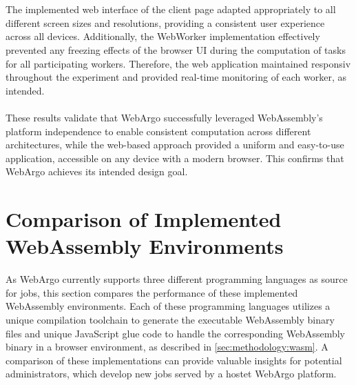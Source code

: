 \\~\\
The implemented web interface of the client page adapted appropriately to all different screen sizes and resolutions, providing a consistent user experience across all devices. Additionally, the WebWorker implementation effectively prevented any freezing effects of the browser \ac{UI} during the computation of tasks for all participating workers. Therefore, the web application maintained responsiv throughout the experiment and provided real-time monitoring of each worker, as intended.
\\~\\
These results validate that WebArgo successfully leveraged WebAssembly's platform independence to enable consistent computation across different architectures, while the web-based approach provided a uniform and easy-to-use application, accessible on any device with a modern browser. This confirms that WebArgo achieves its intended design goal.

\section{Comparison of Implemented WebAssembly Environments}
\label{sec:evaluation:languages}
As WebArgo currently supports three different programming languages as source for jobs, this section compares the performance of these implemented WebAssembly environments. Each of these programming languages utilizes a unique compilation toolchain to generate the executable WebAssembly binary files and unique JavaScript glue code to handle the corresponding WebAssembly binary in a browser environment, as described in \autoref{sec:methodology:wasm}. A comparison of these implementations can provide valuable insights for potential administrators, which develop new jobs served by a hostet WebArgo platform.


